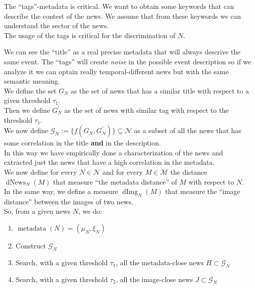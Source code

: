 \documentclass[10pt, journal,twocolumn]{IEEEtran}
\DeclareMathOperator{\mtdt}{metadata}
\DeclareMathOperator{\distn}{dNews}
\DeclareMathOperator{\disti}{dImg}
\begin{document}
The ``tags''-metadata is critical. We want to obtain some keywords that can describe the contest of the news. We assume that from these keywords we can understand the sector of the news.\\
The usage of the tags is critical for the discrimination of $N$.

We can see the ``title'' as a real precise metadata that will always descrive the same event. The ``tags'' will create \emph{noise} in the possible event description so if we analyze it we can optain really temporal-different news but with the same semantic meaning.\\[0,3cm]

We define the set $G_N$ as the set of news that has a similar title with respect to a given threshold $\tau_1$.\\
Then we define $G_N^\prime$ as the set of news with similar tag with respect to the threshold $\tau_1$.\\
We now define $\mathcal{G}_N := \{ f(G_N,G_N^\prime) \} \subseteq \mathcal{N}$ as a subset of all the news that has some correlation in the title \textbf{and} in the description.\\
In this way we have empirically done a characterization of the news and extracted just the news that have a high correlation in the metadata.\\[0,2cm]

We now define for every $N \in \mathcal{N}$ and for every $M \in \mathcal{M}$  the distance $\distn_N(M)$ that measure ``the metadata distance'' of $M$ with respect to $N$.\\
In the same way, we define a measure $\disti_N(M)$ that measure the ``image distance'' between the images of two news.\\[0.3cm]


So, from a given news $N$, we do:

\begin{enumerate}
	\item $\mtdt(N) = (\mu_N,\xi_N)$
	\item Construct $\mathcal{G}_N$
	\item Search, with a given threshold $\tau_1$, all the metadata-close news $H \subset \mathcal{G}_N$
	\item Search, with a given threshold $\tau_2$, all the image-close news $J \subset \mathcal{G}_N$
\end{enumerate}

\-\\[0,1cm]
\end{document}
